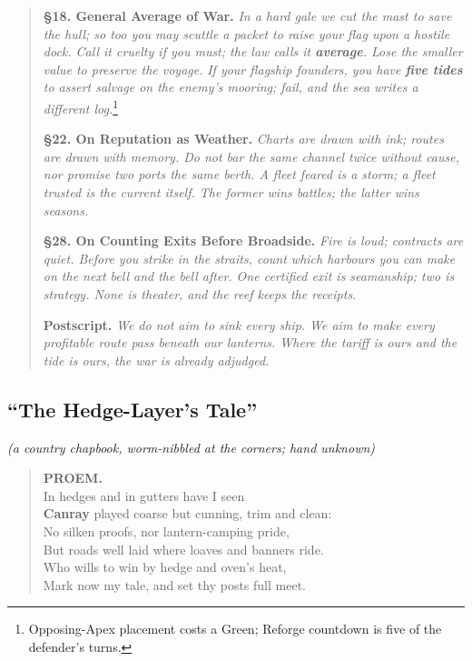 \documentclass[11pt]{article}
\begin{document}
\begin{quote}
\medskip
\textbf{§18. General Average of War.} \emph{In a hard gale we cut the mast to save the hull; so too you may scuttle a packet to raise your flag upon a hostile dock. Call it cruelty if you must; the law calls it \textbf{average}. Lose the smaller value to preserve the voyage.} \emph{If your flagship founders, you have \textbf{five tides} to assert salvage on the enemy's mooring; fail, and the sea writes a different log.}\footnote{Opposing-Apex placement costs a Green; Reforge countdown is five of the defender's turns.}

\medskip
\textbf{§22. On Reputation as Weather.} \emph{Charts are drawn with ink; routes are drawn with memory. Do not bar the same channel twice without cause, nor promise two ports the same berth. A fleet feared is a storm; a fleet trusted is the current itself. The former wins battles; the latter wins seasons.}

\medskip
\textbf{§28. On Counting Exits Before Broadside.} \emph{Fire is loud; contracts are quiet. Before you strike in the straits, count which harbours you can make on the next bell and the bell after. One certified exit is seamanship; two is strategy. None is theater, and the reef keeps the receipts.}

\medskip
\textbf{Postscript.} \emph{We do not aim to sink every ship. We aim to make every profitable route pass beneath our lanterns. Where the tariff is ours and the tide is ours, the war is already adjudged.}
\end{quote}

\clearpage

\subsection{``The Hedge-Layer's Tale''}
\emph{(a country chapbook, worm-nibbled at the corners; hand unknown)}

\begin{verse}
\textbf{PROEM.}\\
In hedges and in gutters have I seen\\
\textbf{Canray} played coarse but cunning, trim and clean:\\
No silken proofs, nor lantern-camping pride,\\
But roads well laid where loaves and banners ride.\\
Who wills to win by hedge and oven's heat,\\
Mark now my tale, and set thy posts full meet.
\end{verse}
\end{document}
